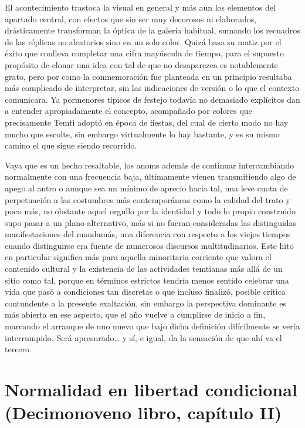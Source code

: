 \documentclass[
]{book}
\begin{document}
El acontecimiento trastoca la visual en general y más aun los elementos del apartado central, con efectos que sin ser muy decorosos ni elaborados, drásticamente transforman la óptica de la galería habitual, sumando los recuadros de las réplicas no aleatorios sino en un solo color. Quizá basa su matiz por el éxito que conlleva completar una cifra mayúscula de tiempo, para el supuesto propósito de clonar una idea con tal de que no desaparezca es notablemente grato, pero por como la conmemoración fue planteada en un principio resultaba más complicado de interpretar, sin las indicaciones de versión o lo que el contexto comunicara. Ya pormenores típicos de festejo todavía no demasiado explícitos dan a entender apropiadamente el concepto, acompañado por colores que precisamente Temti adoptó en época de fiestas, del cual de cierto modo no hay mucho que escolte, sin embargo virtualmente lo hay bastante, y es su mismo camino el que sigue siendo recorrido.

Vaya que es un hecho resaltable, los anoms además de continuar intercambiando normalmente con una frecuencia baja, últimamente vienen transmitiendo algo de apego al antro o aunque sea un mínimo de aprecio hacia tal, una leve cuota de perpetuación a las costumbres más contemporáneas como la calidad del trato y poco más, no obstante aquel orgullo por la identidad y todo lo propio construido supo pasar a un plano alternativo, más si no fueran consideradas las distinguidas manifestaciones del mandamás, una diferencia con respecto a los viejos tiempos cuando distinguirse era fuente de numerosos discursos multitudinarios. Este hito en particular significa más para aquella minoritaria corriente que valora el contenido cultural y la existencia de las actividades temtianas más allá de un sitio como tal, porque en términos estrictos tendría menos sentido celebrar una vida que pasó a condiciones tan discretas o que incluso finalizó, posible crítica contundente a la presente exaltación, sin embargo la perspectiva dominante es más abierta en ese aspecto, que el año vuelve a cumplirse de inicio a fin, marcando el arranque de uno nuevo que bajo dicha definición difícilmente se vería interrumpido. Será apresurado\ldots{} y sí, e igual, da la sensación de que ahí va el tercero.

\hypertarget{normalidad-en-libertad-condicional-decimonoveno-libro-capuxedtulo-ii}{%
\section{Normalidad en libertad condicional (Decimonoveno libro, capítulo II)}\label{normalidad-en-libertad-condicional-decimonoveno-libro-capuxedtulo-ii}}
\end{document}
